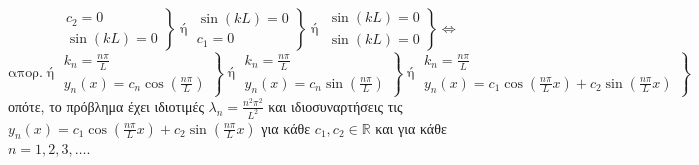 \documentclass[a4paper,table]{report}
\begin{document}
\begin{solution}
\begin{myitemize}
\[        \left.
          \begin{matrix}
            c_{2} = 0 \\
            \sin{(kL)} = 0 
          \end{matrix} 
        \right\} \; \text{ή} \; 
        \left.
          \begin{matrix}
            \sin{(kL)} = 0 \\
            c_{1} = 0 
          \end{matrix} 
        \right\} \; \text{ή} \; 
        \left.
          \begin{matrix}
            \sin{(kL)} = 0 \\
            \sin{(kL)} = 0 
          \end{matrix} 
        \right\} \Leftrightarrow 
      \]
      \[
        \text{απορ.} \; \text{ή} \; 
        \left.
          \begin{matrix}
            k_{n} = \frac{n \pi}{L} \\
            y_{n}(x) = c_{n} \cos{\left(\frac{n \pi}{L}\right)} 
          \end{matrix} 
        \right\} \; \text{ή} \; 
        \left.
          \begin{matrix}
            k_{n} = \frac{n \pi}{L} \\
            y_{n}(x) = c_{n} \sin{\left(\frac{n \pi}{L}\right)} 
          \end{matrix} 
        \right\} \; \text{ή} \;
        \left.
          \begin{matrix}
            k_{n} = \frac{n \pi}{L} \\
            y_{n}(x) = c_{1} \cos{\left(\frac{n \pi}{L} x\right)} + c_{2} 
            \sin{\left(\frac{n \pi}{L} x\right)} 
          \end{matrix}
        \right\} 
      \]
      οπότε, το πρόβλημα έχει ιδιοτιμές $ \lambda _{n} = \frac{n^{2} \pi ^{2}}{L^{2}} $
      και ιδιοσυναρτήσεις τις 
      $ y_{n}(x) = c_{1} \cos{\left(\frac{n \pi}{L} x\right)} + c_{2} 
      \sin{\left(\frac{n \pi}{L} x\right)} $ για κάθε $ c_{1}, c_{2} \in \mathbb{R} $ 
      και για κάθε $ n = 1,2,3,\ldots$.
  \end{myitemize}
\end{solution}
\end{document}
